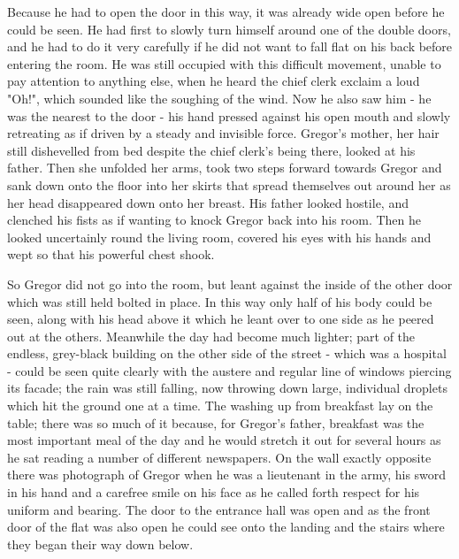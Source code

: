 \documentclass[12pt]{book}
\begin{document}
    Because he had to open the door in this way, it was already wide open before he could be seen. He had first to slowly turn himself around one of the double doors, and he had to do it very carefully if he did not want to fall flat on his back before entering the room. He was still occupied with this difficult movement, unable to pay attention to anything else, when he heard the chief clerk exclaim a loud "Oh!", which sounded like the soughing of the wind. Now he also saw him - he was the nearest to the door - his hand pressed against his open mouth and slowly retreating as if driven by a steady and invisible force. Gregor's mother, her hair still dishevelled from bed despite the chief clerk's being there, looked at his father. Then she unfolded her arms, took two steps forward towards Gregor and sank down onto the floor into her skirts that spread themselves out around her as her head disappeared down onto her breast. His father looked hostile, and clenched his fists as if wanting to knock Gregor back into his room. Then he looked uncertainly round the living room, covered his eyes with his hands and wept so that his powerful chest shook.

    So Gregor did not go into the room, but leant against the inside of the other door which was still held bolted in place. In this way only half of his body could be seen, along with his head above it which he leant over to one side as he peered out at the others. Meanwhile the day had become much lighter; part of the endless, grey-black building on the other side of the street - which was a hospital - could be seen quite clearly with the austere and regular line of windows piercing its facade; the rain was still falling, now throwing down large, individual droplets which hit the ground one at a time. The washing up from breakfast lay on the table; there was so much of it because, for Gregor's father, breakfast was the most important meal of the day and he would stretch it out for several hours as he sat reading a number of different newspapers. On the wall exactly opposite there was photograph of Gregor when he was a lieutenant in the army, his sword in his hand and a carefree smile on his face as he called forth respect for his uniform and bearing. The door to the entrance hall was open and as the front door of the flat was also open he could see onto the landing and the stairs where they began their way down below.
\end{document}
